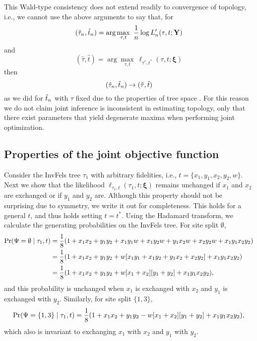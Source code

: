 This Wald-type consistency does not extend readily to convergence of topology, i.e., we cannot use the above arguments to say that, for
\[
(\hat{\tau}_n, \hat{t}_n) = \arg\max_{\tau, t} \ \frac{1}{n}\log L_n'(\tau, t; \mathbf{Y})
\]
and
\[
(\hat{\tau}, \hat{t}) = \arg\max_{\tau, t} \ \ell_{\tau^*,t^*}(\tau, t; \boldsymbol\xi)
\]
then
\[
(\hat{\tau}_n, \hat{t}_n) \rightarrow (\hat{\tau}, \hat{t})
\]
as we did for $\hat{t}_n$ with $\tau$ fixed due to the properties of tree space \citep{Yang1994}.
For this reason we do not claim joint inference is inconsistent in estimating topology, only that there exist parameters that yield degenerate maxima when performing joint optimization.

\subsection*{Properties of the joint objective function}

Consider the InvFels tree $\tau_1$ with arbitrary fidelities, i.e., $t=\{x_1,y_1,x_2,y_2,w\}$.
Next we show that the likelihood $\ell_{\tau_1,t}(\tau_1, t; \boldsymbol\xi)$ remains unchanged if $x_1$ and $x_2$ are exchanged or if $y_1$ and $y_2$ are.
Although this property should not be surprising due to symmetry, we write it out for completeness.
This holds for a general $t$, and thus holds setting $t=t^*$.
Using the Hadamard transform, we calculate the generating probabilities on the InvFels tree.
For site split $\emptyset$,
\begin{align*}
    \Pr(\Psi=\emptyset\mid \tau_1, t) & = \frac{1}{8} (1 + x_1x_2 +  y_1y_2 +  x_1y_1w + x_1y_2w + y_1x_2w + x_2y_2w + x_1y_1x_2y_2) \\
                                              & = \frac{1}{8} (1 + x_1x_2 +  y_1y_2 +  w[x_1y_1 + x_1y_2 + y_1x_2 + x_2y_2] + x_1y_1x_2y_2) \\
                                              & = \frac{1}{8} (1 + x_1x_2 +  y_1y_2 +  w[x_1 + x_2][y_1 + y_2] + x_1y_1x_2y_2),
\end{align*}
and this probability is unchanged when $x_1$ is exchanged with $x_2$ and $y_1$ is exchanged with $y_2$.
Similarly, for site split $\{1,3\}$,
\[
    \Pr(\Psi=\{1,3\}\mid \tau_1, t) = \frac{1}{8} (1 + x_1x_2 +  y_1y_2 -  w[x_1 + x_2][y_1 + y_2] + x_1y_1x_2y_2),
\]
which also is invariant to exchanging $x_1$ with $x_2$ and $y_1$ with $y_2$.

